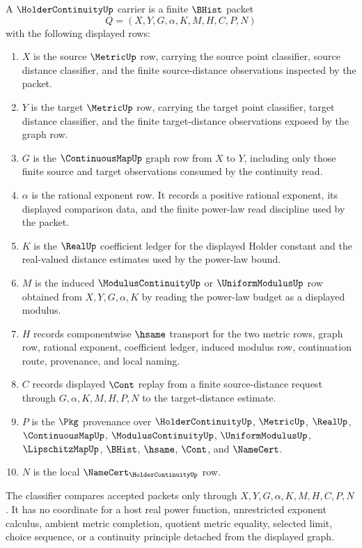 \begin{definition}
\label{def:holder-continuity-carrier}
A $\HolderContinuityUp$ carrier is a finite $\BHist$ packet
$$
Q=(X,Y,G,\alpha,K,M,H,C,P,N)
$$
with the following displayed rows:
\begin{enumerate}
\item $X$ is the source $\MetricUp$ row, carrying the source point classifier, source distance classifier, and the finite source-distance observations inspected by the packet.
\item $Y$ is the target $\MetricUp$ row, carrying the target point classifier, target distance classifier, and the finite target-distance observations exposed by the graph row.
\item $G$ is the $\ContinuousMapUp$ graph row from $X$ to $Y$, including only those finite source and target observations consumed by the continuity read.
\item $\alpha$ is the rational exponent row. It records a positive rational exponent, its displayed comparison data, and the finite power-law read discipline used by the packet.
\item $K$ is the $\RealUp$ coefficient ledger for the displayed Holder constant and the real-valued distance estimates used by the power-law bound.
\item $M$ is the induced $\ModulusContinuityUp$ or $\UniformModulusUp$ row obtained from $X,Y,G,\alpha,K$ by reading the power-law budget as a displayed modulus.
\item $H$ records componentwise $\hsame$ transport for the two metric rows, graph row, rational exponent, coefficient ledger, induced modulus row, continuation route, provenance, and local naming.
\item $C$ records displayed $\Cont$ replay from a finite source-distance request through $G,\alpha,K,M,H,P,N$ to the target-distance estimate.
\item $P$ is the $\Pkg$ provenance over $\HolderContinuityUp$, $\MetricUp$, $\RealUp$, $\ContinuousMapUp$, $\ModulusContinuityUp$, $\UniformModulusUp$, $\LipschitzMapUp$, $\BHist$, $\hsame$, $\Cont$, and $\NameCert$.
\item $N$ is the local $\NameCert_{\HolderContinuityUp}$ row.
\end{enumerate}
The classifier compares accepted packets only through $X,Y,G,\alpha,K,M,H,C,P,N$. It has no coordinate for a host real power function, unrestricted exponent calculus, ambient metric completion, quotient metric equality, selected limit, choice sequence, or a continuity principle detached from the displayed graph.
\end{definition}

